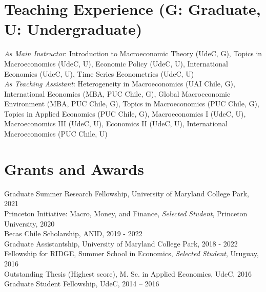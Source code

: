 \documentclass[11pt]{article}
\begin{document}
\section*{Teaching Experience (\footnotesize G: Graduate, U: Undergraduate)}

\textit{As Main Instructor}: Introduction to Macroeconomic Theory (UdeC, G), Topics in Macroeconomics (UdeC, U), Economic Policy (UdeC, U), International Economics (UdeC, U), Time Series Econometrics (UdeC, U)\\
\textit{As Teaching Assistant}: Heterogeneity in Macroeconomics (UAI Chile, G), International Economics (MBA, PUC Chile, G), Global Macroeconomic Environment (MBA, PUC Chile, G), Topics in Macroeconomics (PUC Chile, G), Topics in Applied Economics (PUC Chile, G), Macroeconomics I (UdeC, U), Macroeconomics III (UdeC, U), Economics II (UdeC, U), International Macroeconomics (PUC Chile, U)


\section*{Grants and Awards}
Graduate Summer Research Fellowship, University of Maryland College Park, 2021\\
Princeton Initiative: Macro, Money, and Finance, \emph{Selected Student}, Princeton University, 2020\\
Becas Chile Scholarship, ANID, 2019 - 2022\\
Graduate Assistantship, University of Maryland College Park, 2018 - 2022\\
Fellowship for RIDGE, Summer School in Economics, \emph{Selected Student}, Uruguay, 2016\\
Outstanding Thesis (Highest score), M. Sc. in Applied Economics, UdeC, 2016\\
Graduate Student Fellowship, UdeC, 2014 -- 2016

\iffalse
\section*{Datasets}

``\emph{Chilean Economic Uncertainty Index}", which tracks economic uncertainty in the Chilean economy. Reported monthly by \href{http://www.clapesuc.cl/indicador/indice-de-incertidumbre-economica-iiec/}{CLAPES UC}.\\
``\emph{Chilean Economic Policy Uncertainty Index}", which tracks economic policy uncertainty in the Chilean economy. Reported monthly at the \href{http://www.policyuncertainty.com/chile_monthly.html}{Economic Policy Uncertainty} website managed by Scott Baker (Northwestern-Kellogg), Nicholas Bloom (Stanford) and Steve Davis (Chicago-Booth).
\fi
\end{document}
